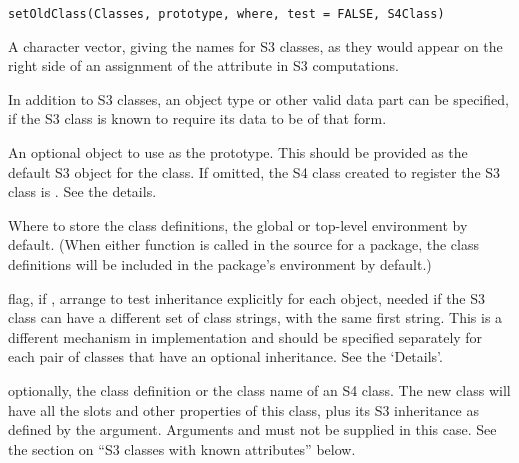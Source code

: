 %
\begin{Usage}
\begin{verbatim}
setOldClass(Classes, prototype, where, test = FALSE, S4Class)
\end{verbatim}
\end{Usage}
%
\begin{Arguments}
\begin{ldescription}
\item[\code{Classes}] 
A character vector, giving the names for S3
classes, as they would appear on the right side of an assignment of
the  attribute in S3 computations.

In addition to S3 classes, an object type or other valid data part
can be specified, if the S3 class is known to require its data to
be of that form.

\item[\code{prototype}] 
An optional object to use as the prototype.  This should be provided
as the default S3 object for the class.  If omitted, the S4 class
created to register the S3 class is .  See the
details.

\item[\code{where}] 
Where to store the class definitions, the global or top-level
environment by default.  (When either function is called in the
source for a package, the class definitions will be included in the
package's environment by default.)

\item[\code{test}] flag, if , arrange to test inheritance
explicitly for each object, needed if the S3 class can have a
different set of class strings, with the same first string.
This is a different mechanism in implementation and should be
specified separately for each pair of classes that have an
optional inheritance.  See the `Details'.

\item[\code{S4Class}]  optionally, the class definition or the class name
of an S4 class.  The new class will have all the slots and other
properties of this class, plus its S3 inheritance as defined by
the  argument.  Arguments  and
 must not be supplied in this case.  See the section
on ``S3 classes with known attributes'' below.

\end{ldescription}
\end{Arguments}
%
